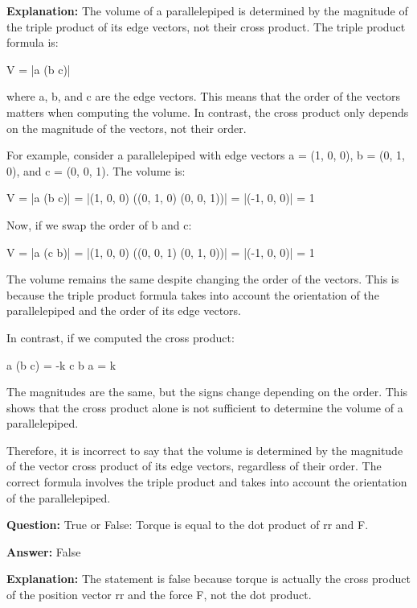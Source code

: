 \documentclass{article}
\begin{document}
                \textbf{Explanation:} The volume of a parallelepiped is determined by the magnitude of the triple product of its edge vectors, not their cross product. The triple product formula is:

V = |a {\texttimes} (b {\texttimes} c)|

where a, b, and c are the edge vectors. This means that the order of the vectors matters when computing the volume. In contrast, the cross product only depends on the magnitude of the vectors, not their order.

For example, consider a parallelepiped with edge vectors a = (1, 0, 0), b = (0, 1, 0), and c = (0, 0, 1). The volume is:

V = |a {\texttimes} (b {\texttimes} c)| = |(1, 0, 0) {\texttimes} ((0, 1, 0) {\texttimes} (0, 0, 1))| = |(-1, 0, 0)| = 1

Now, if we swap the order of b and c:

V = |a {\texttimes} (c {\texttimes} b)| = |(1, 0, 0) {\texttimes} ((0, 0, 1) {\texttimes} (0, 1, 0))| = |(-1, 0, 0)| = 1

The volume remains the same despite changing the order of the vectors. This is because the triple product formula takes into account the orientation of the parallelepiped and the order of its edge vectors.

In contrast, if we computed the cross product:

a {\texttimes} (b {\texttimes} c) = -k
c {\texttimes} b {\texttimes} a = k

The magnitudes are the same, but the signs change depending on the order. This shows that the cross product alone is not sufficient to determine the volume of a parallelepiped.

Therefore, it is incorrect to say that the volume is determined by the magnitude of the vector cross product of its edge vectors, regardless of their order. The correct formula involves the triple product and takes into account the orientation of the parallelepiped.
                
                \vspace{0.5cm} 
        
            
                \textbf {Question:} True or False: Torque is equal to the dot product of rr and F.
                
                \textbf{Answer:} False

                \textbf{Explanation:} The statement is false because torque is actually the cross product of the position vector rr and the force F, not the dot product.
\end{document}
